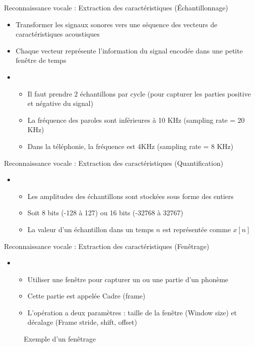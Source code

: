 \documentclass{KodeBook}
\begin{document}
Reconnaissance vocale : Extraction des caractéristiques (Échantillonnage)
\begin{itemize}
	\item Transformer les signaux sonores vers une séquence des vecteurs de caractéristiques acoustiques
	\item Chaque vecteur représente l'information du signal encodée dans une petite fenêtre de temps
	\item {}
	\begin{itemize}
		\item Il faut prendre 2 échantillons par cycle (pour capturer les parties positive et négative du signal)
		\item La fréquence des paroles sont inférieures à 10 KHz (sampling rate = 20 KHz)
		\item Dans la téléphonie, la fréquence est 4KHz (sampling rate = 8 KHz)
	\end{itemize}
\end{itemize}

Reconnaissance vocale : Extraction des caractéristiques (Quantification)
\begin{itemize}
	\item {}
	\begin{itemize}
		\item Les amplitudes des échantillons sont stockées sous forme des entiers
		\item Soit 8 bits (-128 à 127) ou 16 bits (-32768 à 32767)
		\item La valeur d'un échantillon dans un temps $n$ est représentée comme $x[n]$
	\end{itemize}
\end{itemize}

Reconnaissance vocale : Extraction des caractéristiques (Fenêtrage)
	\begin{itemize}
	\item {}
	\begin{itemize}
		\item Utiliser une fenêtre pour capturer un ou une partie d'un phonème 
		\item Cette partie est appelée Cadre (frame)
		\item L'opération a deux paramètres : taille de la fenêtre (Window size) et décalage (Frame stride, shift, offset)
	\end{itemize}
\end{itemize}
\begin{figure}
	\centering
	\caption{Exemple d'un fenêtrage \cite{2020-jurafsky-martin}}
\end{figure}
\end{document}
